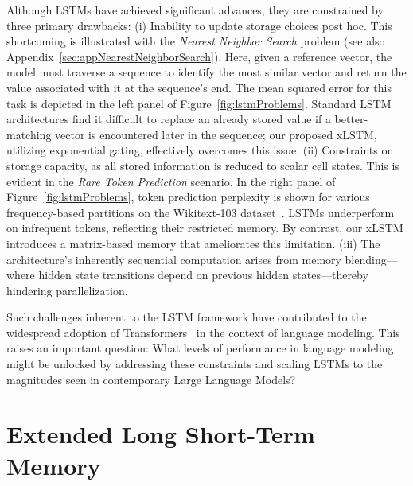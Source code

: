 Although LSTMs have achieved significant advances, they are constrained by three primary drawbacks: (i) Inability to update storage choices post hoc. This shortcoming is illustrated with the {\it Nearest Neighbor Search} problem (see also Appendix~\ref{sec:appNearestNeighborSearch}). Here, given a reference vector, the model must traverse a sequence to identify the most similar vector and return the value associated with it at the sequence’s end. The mean squared error for this task is depicted in the left panel of Figure~\ref{fig:lstmProblems}. Standard LSTM architectures find it difficult to replace an already stored value if a better-matching vector is encountered later in the sequence; our proposed xLSTM, utilizing exponential gating, effectively overcomes this issue. (ii) Constraints on storage capacity, as all stored information is reduced to scalar cell states. This is evident in the {\it Rare Token Prediction} scenario. In the right panel of Figure~\ref{fig:lstmProblems}, token prediction perplexity is shown for various frequency-based partitions on the Wikitext-103 dataset~\citep{Merity:17}. LSTMs underperform on infrequent tokens, reflecting their restricted memory. By contrast, our xLSTM introduces a matrix-based memory that ameliorates this limitation. (iii) The architecture’s inherently sequential computation arises from memory blending—where hidden state transitions depend on previous hidden states—thereby hindering parallelization.

Such challenges inherent to the LSTM framework have contributed to the widespread adoption of Transformers~\citep{Vaswani:17} in the context of language modeling. This raises an important question: What levels of performance in language modeling might be unlocked by addressing these constraints and scaling LSTMs to the magnitudes seen in contemporary Large Language Models?

\section{Extended Long Short-Term Memory}
\label{sec:xLSTM}

